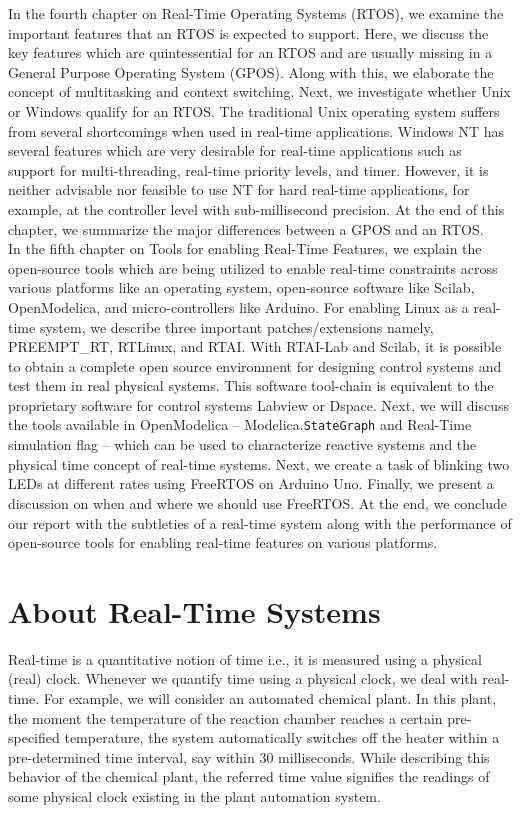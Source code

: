 \documentclass[12pt]{report}
\begin{document}
In the fourth chapter on Real-Time Operating Systems (RTOS), we examine the important features that an RTOS is expected to support. Here, we discuss the key features which are quintessential for an RTOS and are usually missing in a General Purpose Operating System (GPOS). Along with this, we elaborate the concept of multitasking and context switching. Next, we investigate whether Unix or Windows qualify for an RTOS.  The  traditional  Unix  operating  system suffers  from  several  shortcomings  when  used  in  real-time  applications. Windows NT has several features which are very desirable for real-time applications such as support for multi-threading, real-time priority levels, and timer. However, it is neither advisable nor feasible to use NT for hard real-time applications, for example, at the controller level with sub-millisecond precision. At the end of this chapter, we summarize the major differences between a GPOS and an RTOS. \\

In the fifth chapter on Tools for enabling Real-Time Features, we explain the open-source tools which are being utilized to enable real-time constraints across various platforms like an operating system, open-source software like Scilab, OpenModelica, and micro-controllers like Arduino. For enabling Linux as a real-time system, we describe three important patches/extensions namely, PREEMPT\_RT, RTLinux, and RTAI. With RTAI-Lab and Scilab,  it is possible to obtain a complete open source environment for designing control systems and test them in real physical systems.  This software tool-chain is equivalent to the proprietary software for control systems Labview or Dspace. Next, we will discuss the tools available in OpenModelica – Modelica.\texttt{StateGraph} and Real-Time simulation flag – which can be used to characterize reactive systems and the physical time concept of real-time systems. Next, we create a task of blinking two LEDs at different rates using FreeRTOS on Arduino Uno. Finally, we present a discussion on when and where we should use FreeRTOS. At the end, we conclude our report with the subtleties of a real-time system along with the performance of open-source tools for enabling real-time features on various platforms. 
 
 \chapter{About Real-Time Systems}
Real-time is a quantitative notion of time i.e., it is measured using a physical (real) clock. Whenever we quantify time using a physical clock, we deal with real-time. For example, we will consider an automated chemical plant. In this plant, the moment the temperature of the reaction chamber reaches a certain pre-specified temperature, the system automatically switches off the heater within a pre-determined time interval, say within 30 milliseconds. While describing this behavior of the chemical plant, the referred time value signifies the readings of some physical clock existing in the plant automation system.\\ 
\end{document}
